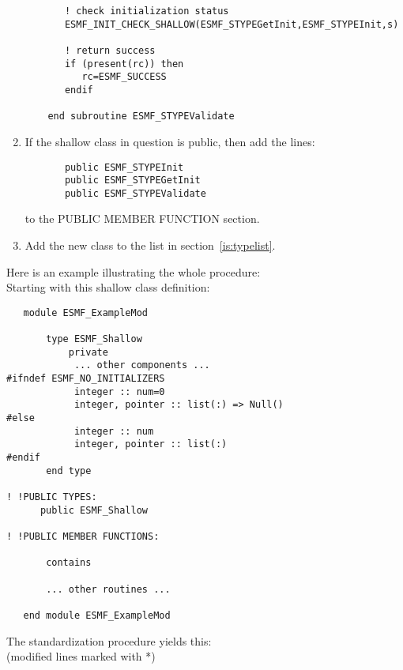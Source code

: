 \begin{enumerate}
\begin{verbatim}
       ! check initialization status
       ESMF_INIT_CHECK_SHALLOW(ESMF_STYPEGetInit,ESMF_STYPEInit,s)
       
       ! return success
       if (present(rc)) then
          rc=ESMF_SUCCESS
       endif

    end subroutine ESMF_STYPEValidate
\end{verbatim}

\item If the shallow class in question is public, then
    add the lines:
\begin{verbatim}
       public ESMF_STYPEInit
       public ESMF_STYPEGetInit
       public ESMF_STYPEValidate
\end{verbatim}
    to the PUBLIC MEMBER FUNCTION section. 

\item Add the new class to the list in section~\ref{is:typelist}.

\end{enumerate}

Here is an example illustrating the whole procedure: \\

Starting with this shallow class definition:

\begin{verbatim}
   module ESMF_ExampleMod

       type ESMF_Shallow
           private
            ... other components ...
#ifndef ESMF_NO_INITIALIZERS
            integer :: num=0
            integer, pointer :: list(:) => Null()
#else
            integer :: num
            integer, pointer :: list(:)
#endif
       end type

! !PUBLIC TYPES:
      public ESMF_Shallow 
     
! !PUBLIC MEMBER FUNCTIONS:

       contains

       ... other routines ...

   end module ESMF_ExampleMod
\end{verbatim}

The standardization procedure yields this:\\
(modified lines marked with *)

